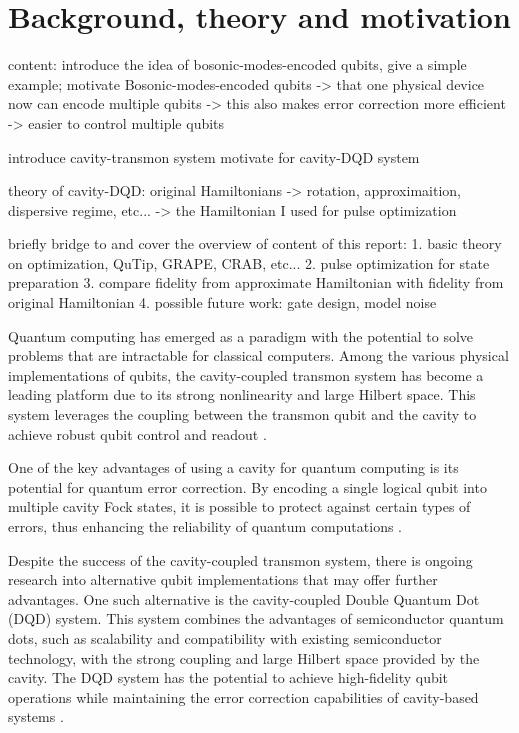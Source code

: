 \documentclass{article}
\begin{document}
\section{Background, theory and motivation}
content: 
introduce the idea of bosonic-modes-encoded qubits, give a simple example;
motivate Bosonic-modes-encoded qubits 
    -> that one physical device now can encode multiple qubits
    -> this also makes error correction more efficient -> easier to control multiple qubits

introduce cavity-transmon system 
motivate for cavity-DQD system

theory of cavity-DQD: 
original Hamiltonians -> rotation, approximaition, dispersive regime, etc... -> the Hamiltonian I used for pulse optimization

briefly bridge to and cover the overview of content of this report: 
1. basic theory on optimization, QuTip, GRAPE, CRAB, etc...
2. pulse optimization for state preparation
3. compare fidelity from approximate Hamiltonian with fidelity from original Hamiltonian 
4. possible future work: gate design, model noise

Quantum computing has emerged as a paradigm with the potential to solve problems that are intractable for classical computers. Among the various physical implementations of qubits, the cavity-coupled transmon system has become a leading platform due to its strong nonlinearity and large Hilbert space. This system leverages the coupling between the transmon qubit and the cavity to achieve robust qubit control and readout \cite{blais2004, houck2008}.

One of the key advantages of using a cavity for quantum computing is its potential for quantum error correction. By encoding a single logical qubit into multiple cavity Fock states, it is possible to protect against certain types of errors, thus enhancing the reliability of quantum computations \cite{girvin2014, ofek2016}.

Despite the success of the cavity-coupled transmon system, there is ongoing research into alternative qubit implementations that may offer further advantages. One such alternative is the cavity-coupled Double Quantum Dot (DQD) system. This system combines the advantages of semiconductor quantum dots, such as scalability and compatibility with existing semiconductor technology, with the strong coupling and large Hilbert space provided by the cavity. The DQD system has the potential to achieve high-fidelity qubit operations while maintaining the error correction capabilities of cavity-based systems \cite{petersson2012, mi2018}.
\end{document}
